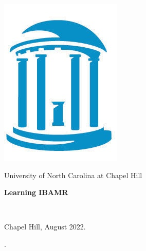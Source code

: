 \documentclass[12pt,a4paper,twoside]{article}
\begin{document}
\thispagestyle{empty}
\begin{center}
\includegraphics[scale=0.4]{UNC_logo-main.jpg}
\end{center}
\begin{center}
University of North Carolina at Chapel Hill\\
\vspace{5cm}
\begin{Large}
\textbf{Learning IBAMR}\\
\end{Large}
\vspace{4.5cm}
\begin{tabular}{llC{4cm}llll}

\end{tabular}\\
\vspace{4.5cm}
Chapel Hill, August 2022.
\end{center}

\newpage
\thispagestyle{empty}
.


 \newpage
\thispagestyle{empty}
\tableofcontents
\end{document}
